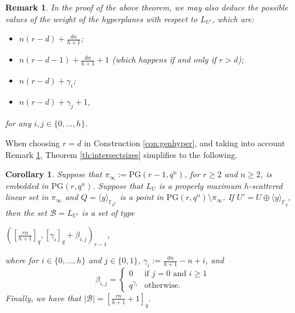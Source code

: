 \documentclass[11pt]{amsart}
\newtheorem{corollary}[theorem]{Corollary}
\newtheorem{remark}[theorem]{Remark}
\newcommand{\PG}{\mathrm{PG}}
\begin{document}
\begin{remark}\label{rk:weighthyperconstrB}
In the proof of the above theorem, we may also deduce the possible values of the weight of the hyperplanes with respect to $L_{U'}$, which are:
\begin{itemize}
    \item $n(r-d)+\frac{dn}{h+1}$;
    \item $n(r-d-1)+\frac{dn}{h+1}+1$ (which happens if and only if $r>d$);
    \item $n(r-d)+\gamma_i$;
    \item $n(r-d)+\gamma_j+1$,
\end{itemize}
for any $i,j \in \{0,\ldots,h\}$.
\end{remark}


When choosing $r=d$ in Construction \ref{con:genhyper},  and taking into account Remark \ref{rk:weighthyperconstrB}, Theorem \ref{th:intersectsizes} simplifies to the following.

\begin{corollary}
\label{th:constrnocompl}
Suppose that $\pi_\infty:=\PG(r-1,q^n)$, for $r\geq 2$ and $n\geq 2$, is embedded in $\PG(r,q^n)$. Suppose that $L_{U}$ is a properly maximum $h$-scattered linear set in $\pi_\infty$ and $Q=\langle y\rangle_{\mathbb{F}_{q^n}}$ is a point in $\PG(r,q^n)\setminus\pi_\infty$. If $U'=U \oplus \langle y\rangle_{\mathbb{F}_{q}}$, then the set $\mathcal{B}=L_{U'}$ is a set of type
\begin{center}
$\left( 
\left[\frac{rn}{h+1}\right]_q, [\gamma_i]_q+\beta_{i,j}
\right)_{r-1}$,
\end{center}
where for $i\in\{0,...,h\}$ and $j \in \{0,1\}$, $\gamma_i:=\frac{dn}{h+1}-n+i$, and 
\[\beta_{i,j} = \begin{cases}
0 & \text{if } j=0 \text{ and } i \geq 1\\
q^{\gamma_i} & \text{otherwise}.
\end{cases}
\]
Finally, we have that $\lvert \mathcal{B} \rvert=\left[\frac{rn}{h+1}+1\right]_q$.%
\end{corollary}
\end{document}
